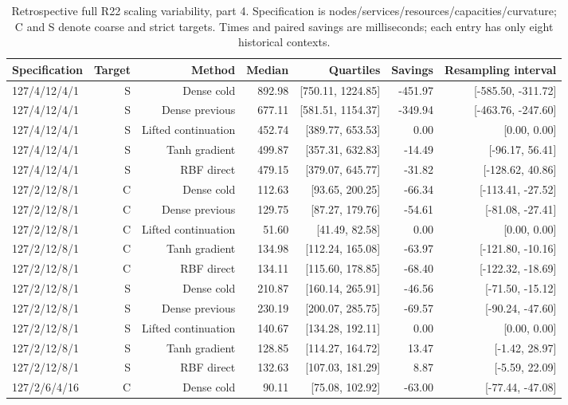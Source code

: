 \documentclass[11pt,letterpaper]{article}
\theoremstyle{definition}
\newcommand{\1}{\mathbf 1}
\begin{document}
\begin{table}[tbp]\centering\scriptsize
\caption{Retrospective full R22 scaling variability, part 4. Specification is nodes/services/resources/capacities/curvature; C and S denote coarse and strict targets. Times and paired savings are milliseconds; each entry has only eight historical contexts.}
\label{tab:r24-old-scaling-4}
\begin{tabular}{lrrrrrr}
\toprule
Specification & Target & Method & Median & Quartiles & Savings & Resampling interval\\
\midrule
127/4/12/4/1 & S & Dense cold & 892.98 & [750.11, 1224.85] & -451.97 & [-585.50, -311.72]\\
127/4/12/4/1 & S & Dense previous & 677.11 & [581.51, 1154.37] & -349.94 & [-463.76, -247.60]\\
127/4/12/4/1 & S & Lifted continuation & 452.74 & [389.77, 653.53] & 0.00 & [0.00, 0.00]\\
127/4/12/4/1 & S & Tanh gradient & 499.87 & [357.31, 632.83] & -14.49 & [-96.17, 56.41]\\
127/4/12/4/1 & S & RBF direct & 479.15 & [379.07, 645.77] & -31.82 & [-128.62, 40.86]\\
127/2/12/8/1 & C & Dense cold & 112.63 & [93.65, 200.25] & -66.34 & [-113.41, -27.52]\\
127/2/12/8/1 & C & Dense previous & 129.75 & [87.27, 179.76] & -54.61 & [-81.08, -27.41]\\
127/2/12/8/1 & C & Lifted continuation & 51.60 & [41.49, 82.58] & 0.00 & [0.00, 0.00]\\
127/2/12/8/1 & C & Tanh gradient & 134.98 & [112.24, 165.08] & -63.97 & [-121.80, -10.16]\\
127/2/12/8/1 & C & RBF direct & 134.11 & [115.60, 178.85] & -68.40 & [-122.32, -18.69]\\
127/2/12/8/1 & S & Dense cold & 210.87 & [160.14, 265.91] & -46.56 & [-71.50, -15.12]\\
127/2/12/8/1 & S & Dense previous & 230.19 & [200.07, 285.75] & -69.57 & [-90.24, -47.60]\\
127/2/12/8/1 & S & Lifted continuation & 140.67 & [134.28, 192.11] & 0.00 & [0.00, 0.00]\\
127/2/12/8/1 & S & Tanh gradient & 128.85 & [114.27, 164.72] & 13.47 & [-1.42, 28.97]\\
127/2/12/8/1 & S & RBF direct & 132.63 & [107.03, 181.29] & 8.87 & [-5.59, 22.09]\\
127/2/6/4/16 & C & Dense cold & 90.11 & [75.08, 102.92] & -63.00 & [-77.44, -47.08]\\

\end{tabular}
\end{table}
\end{document}
